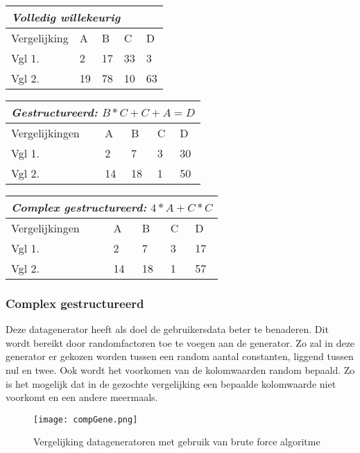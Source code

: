 \documentclass[Main.tex]{subfiles}
\begin{document}
\begin{center}
\begin{tabular}{@{} *5l @{}}    \toprule
\multicolumn{5}{l}{\emph{Volledig willekeurig}}\\\midrule
 Vergelijking & A  & B  & C  & D  \\ 
 Vgl 1. & 2 & 17 & 33 & 3\\ 
 Vgl 2. & 19 & 78 & 10 & 63\\\bottomrule
 \hline
\end{tabular}

\begin{tabular}{@{} *5l @{}}    \toprule
\multicolumn{5}{l}{\emph{Gestructureerd: } $B*C+C+A = D$} \\ \midrule
 Vergelijkingen & A  & B  & C  & D  \\ 
 Vgl 1. & 2 & 7 & 3 & 30\\ 
 Vgl 2. & 14 & 18 & 1 & 50\\\bottomrule
 \hline
\end{tabular}

\begin{tabular}{@{} *5l @{}}    \toprule
\multicolumn{5}{l}{\emph{Complex gestructureerd:}  $4*A+C*C$}\\\midrule
 Vergelijkingen & A  & B  & C  & D  \\ 
 Vgl 1. & 2 & 7 & 3 & 17\\ 
 Vgl 2. & 14 & 18 & 1 & 57\\\bottomrule
 \hline
\end{tabular}
\end{center}

\subsubsection*{Complex gestructureerd}
Deze datagenerator heeft als doel de gebruikersdata beter te benaderen. Dit wordt bereikt door randomfactoren toe te voegen aan de generator. Zo zal in deze generator er gekozen worden tussen een random aantal constanten, liggend tussen nul en twee. Ook wordt het voorkomen van de kolomwaarden random bepaald. Zo is het mogelijk dat in de gezochte vergelijking een bepaalde kolomwaarde niet voorkomt en een andere meermaals.

\begin{figure}
\centering
\texttt{[image: compGene.png]}
\caption{Vergelijking datageneratoren met gebruik van brute force algoritme} \label{fig:datageneratoren}
\end{figure}
\end{document}

